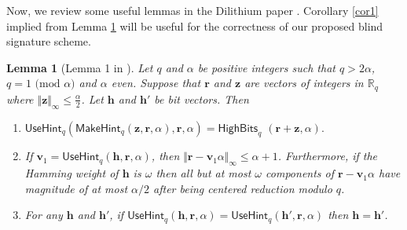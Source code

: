 \documentclass[conference]{IEEEtran}
\newtheorem{lemma}[theorem]{Lemma}
\begin{document}
	
	
	
	Now, we review some useful lemmas in the \textsf{Dilithium} paper \cite{DKL+19}. Corollary \ref{cor1} implied from Lemma \ref{lem1} will be 
	useful for the correctness of our proposed blind signature scheme. 
	\begin{lemma}[Lemma 1 in \cite{DKL+19}] \label{lem1}
		Let $q$ and $\alpha$ be positive integers such that $q>2\alpha$, $q =1 \text{ (mod } \alpha)$
		and $\alpha$ even. Suppose that $\mathbf{r}$ and $\mathbf{z}$ are vectors of integers in $\mathbb{R}_q$ where $\Vert \mathbf{z} \Vert_{\infty}\leq \frac{\alpha}{2}$. Let $ \mathbf{h}$ and $\mathbf{h}'$ be bit vectors. Then 
		\begin{enumerate}
			\item[i.] 
			$\mathsf{UseHint}_q(\mathsf{MakeHint}_q(\mathbf{z},\mathbf{r},\alpha),\mathbf{r},\alpha) = \mathsf{HighBits}_q$ $(\mathbf{r}+\mathbf{z}, \alpha).$
			\item[ii.] If  $\mathbf{v}_1=\mathsf{UseHint}_q(\mathbf{h},\mathbf{r},\alpha)$, then $\Vert  \mathbf{r}-\mathbf{v}_1\alpha\Vert_{\infty} \leq \alpha+1$. Furthermore, if the Hamming weight of $\mathbf{h}$ is $\omega$ then all but at most $\omega$ components of $\mathbf{r}-\mathbf{v}_1\alpha$ have magnitude of at most $\alpha/2$ after being  centered reduction modulo $q$.
			\item[iii.] For any $\mathbf{h}$ and $\mathbf{h}'$, if $\mathsf{UseHint}_q(\mathbf{h},\mathbf{r},\alpha)=\mathsf{UseHint}_q(\mathbf{h}',\mathbf{r},\alpha)$ then $\mathbf{h}=\mathbf{h}'$.
		\end{enumerate}
	\end{lemma}
	
\end{document}
